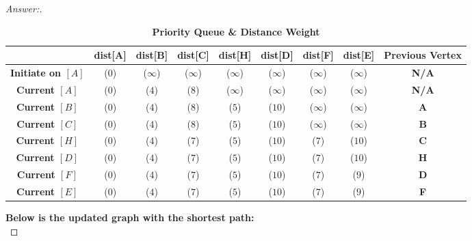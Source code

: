 \documentclass[11pt]{article}
\theoremstyle{definition}
\theoremstyle{definition}
\theoremstyle{definition}
\begin{document}
\begin{proof}[Answer:]
	\begin{table}[ht]
		\caption{\textbf{Priority Queue \& Distance Weight}}
		\centering
		\begin{tabular}{|c|c|c|c|c|c|c|c|c|}
			\hline
			& dist[\textbf{A}] & dist[\textbf{B}] & dist[\textbf{C}] & dist[\textbf{H}] & dist[\textbf{D}] & dist[\textbf{F}] & dist[\textbf{E}] & \textbf{Previous Vertex} \\  [0.5ex]
			\hline 
			\textbf{Initiate on $[A]$} & (\textbf{$0$}) & (\textbf{$\infty$}) & (\textbf{$\infty$}) & (\textbf{$\infty$}) & (\textbf{$\infty$})& (\textbf{$\infty$}) & (\textbf{$\infty$}) & \textbf{N/A} \\ 
			\hline 
			\textbf{Current $[A]$} & (\textbf{$0$}) & (\textbf{$4$}) & (\textbf{$8$}) & (\textbf{$\infty$}) & (\textbf{$\infty$})& (\textbf{$\infty$}) & (\textbf{$\infty$}) & \textbf{N/A} \\  
			\hline 
			\textbf{Current $[B]$} & (\textbf{$0$}) & (\textbf{$4$}) & (\textbf{$8$}) & (\textbf{$5$}) & (\textbf{$10$}) & (\textbf{$\infty$}) & (\textbf{$\infty$}) & \textbf{A} \\  
			\hline
			\textbf{Current $[C]$} & (\textbf{$0$}) & (\textbf{$4$}) & {(\textbf{$8$})} & (\textbf{$5$}) & (\textbf{$10$}) & (\textbf{$\infty$}) & (\textbf{$\infty$}) & \textbf{B} \\   
			\hline 
			\textbf{Current $[H]$} & (\textbf{$0$}) & (\textbf{$4$}) & (\textbf{$7$}) & (\textbf{$5$}) & (\textbf{$10$}) & (\textbf{$7$}) & (\textbf{$10$}) & \textbf{C} \\ 
			\hline 
			\textbf{Current $[D]$} & (\textbf{$0$}) & (\textbf{$4$}) & (\textbf{$7$}) & (\textbf{$5$}) & (\textbf{$10$}) & (\textbf{$7$}) & (\textbf{$10$}) & \textbf{H} \\
			\hline
			\textbf{Current $[F]$} & (\textbf{$0$}) & (\textbf{$4$}) & (\textbf{$7$}) & (\textbf{$5$}) & (\textbf{$10$}) & (\textbf{$7$}) & (\textbf{$9$}) & \textbf{D} \\
			\hline 
			\textbf{Current $[E]$} & \color{red} (\textbf{$0$}) & \color{red} (\textbf{$4$}) & \color{red} (\textbf{$7$}) & \color{red} (\textbf{$5$}) & \color{red} (\textbf{$10$}) & \color{red} (\textbf{$7$}) & \color{red} (\textbf{$9$}) & \textbf{F} \\
			\hline 
		\end{tabular} 
        \label{table:nonlin}
	\end{table}	

\item \textbf{Below is the updated graph with the shortest path:} \\


\end{proof}
\end{document}
